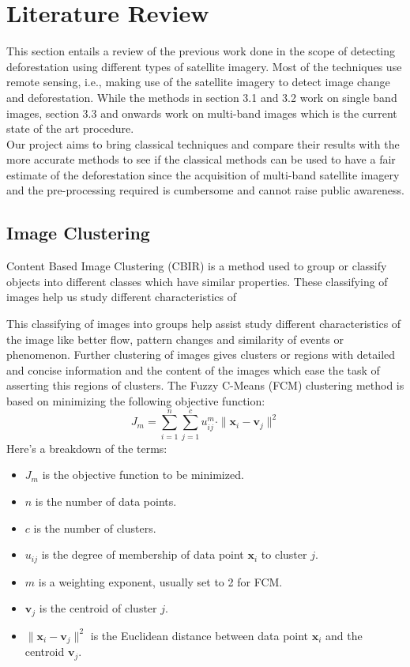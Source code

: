 \documentclass[12pt,a4paper,IEEEtran]{article}
\begin{document}
\section{Literature Review}
This section entails a review of the previous work done in the scope of detecting deforestation using different types of satellite imagery. Most of the techniques use remote sensing, i.e., making use of the satellite imagery to detect image change and deforestation. While the methods in section 3.1 and 3.2 work on single band images, section 3.3 and onwards work on multi-band images which is the current state of the art procedure. \\
Our project aims to bring classical techniques and compare their results with the more accurate methods to see if the classical methods can be used to have a fair estimate of the deforestation since the acquisition of multi-band satellite imagery and the pre-processing required is cumbersome and cannot raise public awareness.



\subsection[3.1]{Image Clustering} 
Content Based Image Clustering (CBIR) is a method used to group or classify objects into different classes which have similar properties. These classifying of images help us study different characteristics of 

This classifying of images into groups help assist study different characteristics of the image like better flow, pattern changes and similarity of events or phenomenon. Further clustering of images gives clusters or regions with detailed and concise information and the content of the images which ease the task of asserting this regions of clusters. 
\newpage The Fuzzy C-Means (FCM) clustering method \cite{BEZDEK1984191} is based on minimizing the following objective function:
\begin{equation}
J_m = \sum_{i=1}^{n} \sum_{j=1}^{c} u_{ij}^m \cdot \|\mathbf{x}_i - \mathbf{v}_j\|^2
\end{equation}
\newline Here's a breakdown of the terms:
\begin{itemize}
    \item $J_m$ is the objective function to be minimized.
    \item $n$ is the number of data points.
    \item $c$ is the number of clusters.
    \item $u_{ij}$ is the degree of membership of data point $\mathbf{x}_i$ to cluster $j$.
    \item $m$ is a weighting exponent, usually set to 2 for FCM.
    \item $\mathbf{v}_j$ is the centroid of cluster $j$.
    \item $\|\mathbf{x}_i - \mathbf{v}_j\|^2$ is the Euclidean distance between data point $\mathbf{x}_i$ and the centroid $\mathbf{v}_j$.
\end{itemize}
\end{document}
